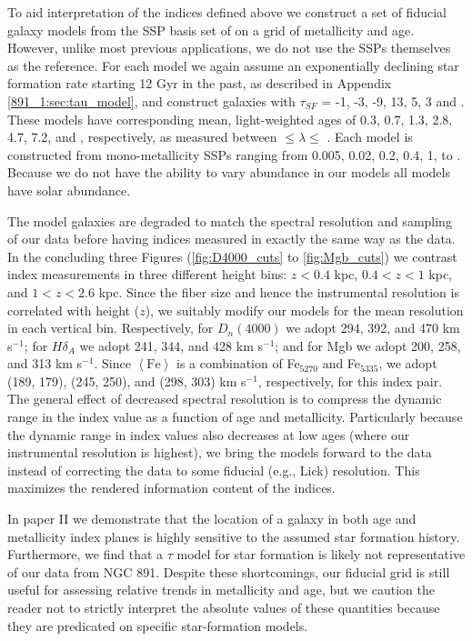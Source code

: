 To aid interpretation of the indices defined above we construct a set
of fiducial galaxy models from the SSP basis set of \citet{Bruzual03}
on a grid of metallicity and age. However, unlike most previous
applications, we do not use the SSPs themselves as the reference. For
each model we again assume an exponentially declining star formation
rate starting 12 Gyr in the past, as described in Appendix
\ref{891_1:sec:tau_model}, and construct galaxies with $\tau_{SF}$ = -1, -3,
-9, 13, 5, 3 and . These models have corresponding mean,
light-weighted ages of 0.3, 0.7, 1.3, 2.8, 4.7, 7.2, and
, respectively, as measured between 
$\leq\lambda\leq$ . Each model is constructed from
mono-metallicity SSPs ranging from 0.005, 0.02, 0.2, 0.4, 1, to
. Because we do not have the ability to vary abundance
in our models \citep[as done, for example, by][]{Trager08} all models
have solar abundance. 

The model galaxies are degraded to match the spectral resolution and
sampling of our \GP data before having indices measured in exactly the
same way as the data. In the concluding three Figures
(\ref{fig:D4000_cuts} to \ref{fig:Mgb_cuts}) we contrast index
measurements in three different height bins: $z<0.4$ kpc, $0.4<z<1$
kpc, and $1<z<2.6$ kpc. Since the fiber size and hence the
instrumental resolution is correlated with height ($z$), we suitably
modify our models for the mean resolution in each vertical
bin. Respectively, for $D_n(4000)$ we adopt 294, 392, and 470 km
s$^{-1}$; for $H\delta_A$ we adopt 241, 344, and 428 km s$^{-1}$;
and for Mgb we adopt 200, 258, and 313 km s$^{-1}$. Since
$\left<\mathrm{Fe}\right>$ is a combination of Fe$_{5270}$ and
Fe$_{5335}$, we adopt (189, 179), (245, 250), and (298, 303) km
s$^{-1}$, respectively, for this index pair.  The general effect of
decreased spectral resolution is to compress the dynamic range in the
index value as a function of age and metallicity. Particularly because
the dynamic range in index values also decreases at low ages (where
our instrumental resolution is highest), we bring the models forward
to the data instead of correcting the data to some fiducial (e.g.,
Lick) resolution. This maximizes the rendered information content of
the indices.

In paper II we demonstrate that the location of a galaxy in both age
and metallicity index planes is highly sensitive to the assumed star
formation history. Furthermore, we find that a $\tau$ model for star
formation is likely not representative of our data from NGC
891. Despite these shortcomings, our fiducial grid is still useful for
assessing relative trends in metallicity and age, but we caution the
reader not to strictly interpret the absolute values of these
quantities because they are predicated on specific star-formation
models. 

